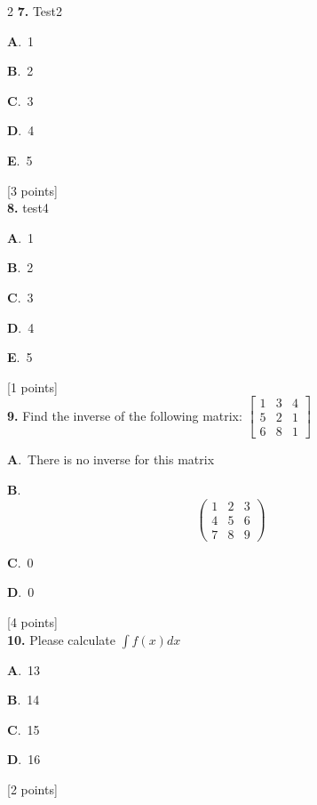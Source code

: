 \documentclass[12pt]{article}
\newcommand{\choice}[3]{%
  \noindent\textbf{#1}.~#2\hfill#3\par\vspace{0.25em}
}
\begin{document}
\begin{multicols}{2}
\noindent \textbf{\textenglish{7.}} {\textenglish{Test2}}

\noindent\choice{A}{{\textenglish{1}}}{}
\noindent\choice{B}{{\textenglish{2}}}{}
\noindent\choice{C}{{\textenglish{3}}}{}
\noindent\choice{D}{{\textenglish{4}}}{}
\noindent\choice{E}{{\textenglish{5}}}{}
\hfill {\textenglish{[3 points]}}\\[0.5em]

\noindent \textbf{\textenglish{8.}} {\textenglish{test4}}

\noindent\choice{A}{{\textenglish{1}}}{}
\noindent\choice{B}{{\textenglish{2}}}{}
\noindent\choice{C}{{\textenglish{3}}}{}
\noindent\choice{D}{{\textenglish{4}}}{}
\noindent\choice{E}{{\textenglish{5}}}{}
\hfill {\textenglish{[1 points]}}\\[0.5em]

\noindent \textbf{\textenglish{9.}} {\textenglish{Find the inverse of the following matrix: }}\(\begin{bmatrix} 1 & 3 & 4 \\ 5 & 2 & 1 \\ 6 & 8 & 1 \end{bmatrix}\)

\noindent\choice{A}{{\textenglish{There is no inverse for this matrix}}}{}
\noindent\choice{B}{\[\begin{pmatrix} 1 & 2 & 3 \\ 4 & 5 & 6 \\ 7 & 8 & 9  \end{pmatrix}\]}{}
\noindent\choice{C}{{\textenglish{0}}}{}
\noindent\choice{D}{{\textenglish{0}}}{}
\hfill {\textenglish{[4 points]}}\\[0.5em]

\noindent \textbf{\textenglish{10.}} {\textenglish{Please calculate }}\(\int f(x)dx\)

\noindent\choice{A}{{\textenglish{13}}}{}
\noindent\choice{B}{{\textenglish{14}}}{}
\noindent\choice{C}{{\textenglish{15}}}{}
\noindent\choice{D}{{\textenglish{16}}}{}
\hfill {\textenglish{[2 points]}}\\[0.5em]


\end{multicols}
\end{document}
